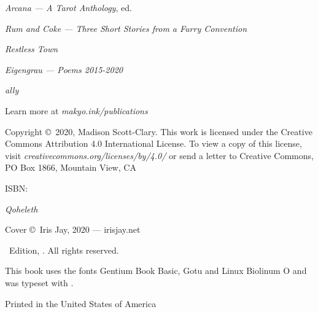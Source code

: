 \singlespacing
\thispagestyle{empty}
\null
\vfill
\begin{center}
    \TitleFamily

    \vspace{2ex}

    \emph{Arcana — A Tarot Anthology}, ed.

    \vspace{1ex}

    \emph{Rum and Coke — Three Short Stories from a Furry Convention}

    \vspace{1ex}

    \emph{Restless Town}

    \vspace{1ex}

    \emph{Eigengrau — Poems 2015-2020}

    \vspace{1ex}

    \emph{ally}

    \vspace{2em}

    Learn more at \emph{makyo.ink/publications}
\end{center}
\vfill
\singlespacing
{\small\parindent0pt\parskip5pt
\noindent Copyright \copyright\ 2020, Madison Scott-Clary. This work is licensed under the Creative Commons Attribution 4.0 International License. To view a copy of this license, visit \mbox{\emph{creativecommons.org/licenses/by/4.0/}} or send a letter to Creative Commons, PO Box 1866, Mountain View, CA

\vspace{1ex}

ISBN: \ISBN

\vspace{1ex}

\textit{Qoheleth}

\vspace{1ex}

Cover \copyright\ Iris Jay, 2020 --- irisjay.net

\vspace{1ex}

\Edition\ Edition, \Year. All rights reserved.

\vspace{1ex}

This book uses the fonts Gentium Book Basic, {\DisplayFont Gotu} and {\TitleFont Linux Biolinum O} and was typeset with {\XeLaTeX}.

Printed in the United States of America\\
\EditionsList
}%

\clearpage
